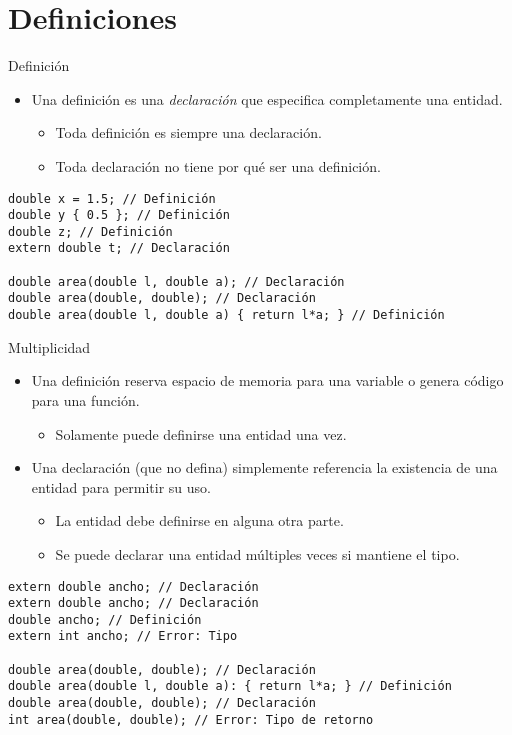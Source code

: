 \section{Definiciones}

\begin{frame}[fragile]{Definición}
  \begin{itemize}
    \item Una \alert{definición} es una \emph{declaración} que especifica completamente una entidad.
      \begin{itemize}
        \item Toda definición es siempre una declaración.
        \item Toda declaración no tiene por qué ser una definición.
      \end{itemize}
  \end{itemize}
\begin{lstlisting}
double x = 1.5; // Definición
double y { 0.5 }; // Definición
double z; // Definición
extern double t; // Declaración

double area(double l, double a); // Declaración
double area(double, double); // Declaración
double area(double l, double a) { return l*a; } // Definición
\end{lstlisting}
\end{frame}

\begin{frame}[fragile]{Multiplicidad}
\begin{itemize}
  \item Una \alert{definición} reserva espacio de memoria para una variable o genera código
        para una función.
    \begin{itemize}
      \item Solamente puede definirse una entidad una vez.
    \end{itemize}
  \item Una \alert{declaración} (que no defina) simplemente referencia la existencia de una entidad
        para permitir su uso.
    \begin{itemize}
      \item La entidad debe definirse en alguna otra parte.
      \item Se puede declarar una entidad múltiples veces si mantiene el tipo.
    \end{itemize}
\end{itemize}
\begin{lstlisting}
extern double ancho; // Declaración
extern double ancho; // Declaración
double ancho; // Definición
extern int ancho; // Error: Tipo

double area(double, double); // Declaración
double area(double l, double a): { return l*a; } // Definición
double area(double, double); // Declaración
int area(double, double); // Error: Tipo de retorno
\end{lstlisting}
\end{frame}

